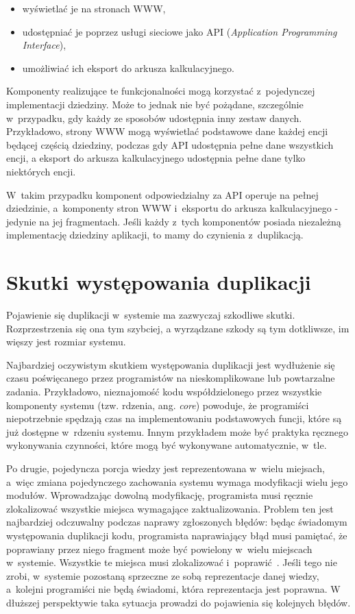 \begin{itemize}
 \item wyświetlać je na stronach WWW,
 \item udostępniać je poprzez usługi sieciowe jako API (\emph{Application Programming Interface}),
 \item umożliwiać ich eksport do arkusza kalkulacyjnego.
\end{itemize}

Komponenty realizujące te funkcjonalności mogą korzystać z~pojedynczej implementacji dziedziny.
Może to jednak nie być pożądane, szczególnie w~przypadku, gdy każdy ze sposobów udostępnia inny zestaw danych.
Przykładowo, strony WWW mogą wyświetlać podstawowe dane każdej encji będącej częścią dziedziny, podczas gdy API udostępnia pełne dane wszystkich encji, a eksport do arkusza kalkulacyjnego udostępnia pełne dane tylko niektórych encji.

W~takim przypadku komponent odpowiedzialny za API operuje na pełnej dziedzinie, a~komponenty stron WWW i~eksportu do arkusza kalkulacyjnego - jedynie na jej fragmentach.
Jeśli każdy z~tych komponentów posiada niezależną implementację dziedziny aplikacji, to mamy do czynienia z~duplikacją.



\section{Skutki występowania duplikacji}

Pojawienie się duplikacji w~systemie ma zazwyczaj szkodliwe skutki.
Rozprzestrzenia się ona tym szybciej, a wyrządzane szkody są tym dotkliwsze, im więszy jest rozmiar systemu.

Najbardziej oczywistym skutkiem występowania duplikacji jest wydłużenie się czasu poświęcanego przez programistów na nieskomplikowane lub powtarzalne zadania.
Przykładowo, nieznajomość kodu współdzielonego przez wszystkie komponenty systemu (tzw. rdzenia, ang. \emph{core}) powoduje, że programiści niepotrzebnie spędzają czas na implementowaniu podstawowych funcji, które są już dostępne w~rdzeniu systemu.
Innym przykładem może być praktyka ręcznego wykonywania czynności, które mogą być wykonywane automatycznie, w~tle.

Po drugie, pojedyncza porcja wiedzy jest reprezentowana w~wielu miejsach, a~więc zmiana pojedynczego zachowania systemu wymaga modyfikacji wielu jego modułów.
Wprowadzając dowolną modyfikację, programista musi ręcznie zlokalizować wszystkie miejsca wymagające zaktualizowania.
Problem ten jest najbardziej odczuwalny podczas naprawy zgłoszonych błędów: będąc świadomym występowania duplikacji kodu, programista naprawiający błąd musi pamiętać, że poprawiany przez niego fragment może być powielony w~wielu miejscach w~systemie.
Wszystkie te miejsca musi zlokalizować i~poprawić~\cite{repetition}.
Jeśli tego nie zrobi, w~systemie pozostaną sprzeczne ze sobą reprezentacje danej wiedzy, a~kolejni programiści nie będą świadomi, która reprezentacja jest poprawna.
W dłuższej perspektywie taka sytuacja prowadzi do pojawienia się kolejnych błędów.

